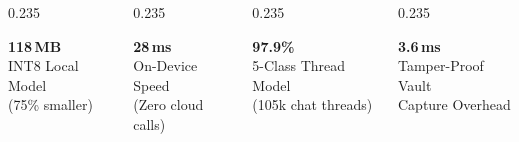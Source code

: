 \documentclass[aspectratio=169,10pt]{beamer}
\begin{document}
\begin{frame}[plain]
  \begin{columns}[T]
    \begin{column}{0.235\textwidth}
      \begin{metriccard}
        {\Large\bfseries\color{snAccent} 118\,MB}\\[2pt]
        {\scriptsize\color{snMuted} INT8 Local Model\\(75\% smaller)}
      \end{metriccard}
    \end{column}
    \begin{column}{0.235\textwidth}
      \begin{metriccard}
        {\Large\bfseries\color{snAccent} 28\,ms}\\[2pt]
        {\scriptsize\color{snMuted} On-Device Speed\\(Zero cloud calls)}
      \end{metriccard}
    \end{column}
    \begin{column}{0.235\textwidth}
      \begin{metriccard}
        {\Large\bfseries\color{snAccent} 97.9\%}\\[2pt]
        {\scriptsize\color{snMuted} 5-Class Thread Model\\(105k chat threads)}
      \end{metriccard}
    \end{column}
    \begin{column}{0.235\textwidth}
      \begin{metriccard}
        {\Large\bfseries\color{snAccent} 3.6\,ms}\\[2pt]
        {\scriptsize\color{snMuted} Tamper-Proof Vault\\Capture Overhead}
      \end{metriccard}
    \end{column}
  \end{columns}
\end{frame}
\end{document}
